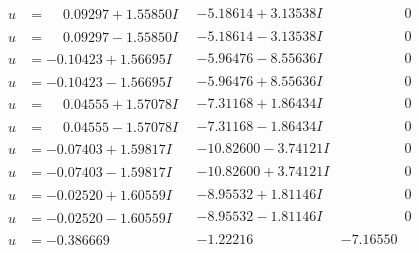 \documentclass[1p]{elsarticle_modified}
\theoremstyle{definition}
\begin{document}
$$\begin{array}{c|c|c}
\begin{aligned}
u &= \phantom{-}0.09297 + 1.55850 I\end{aligned}
 & -5.18614 + 3.13538 I & \phantom{-0.000000 } 0 \\ \hline\begin{aligned}
u &= \phantom{-}0.09297 - 1.55850 I\end{aligned}
 & -5.18614 - 3.13538 I & \phantom{-0.000000 } 0 \\ \hline\begin{aligned}
u &= -0.10423 + 1.56695 I\end{aligned}
 & -5.96476 - 8.55636 I & \phantom{-0.000000 } 0 \\ \hline\begin{aligned}
u &= -0.10423 - 1.56695 I\end{aligned}
 & -5.96476 + 8.55636 I & \phantom{-0.000000 } 0 \\ \hline\begin{aligned}
u &= \phantom{-}0.04555 + 1.57078 I\end{aligned}
 & -7.31168 + 1.86434 I & \phantom{-0.000000 } 0 \\ \hline\begin{aligned}
u &= \phantom{-}0.04555 - 1.57078 I\end{aligned}
 & -7.31168 - 1.86434 I & \phantom{-0.000000 } 0 \\ \hline\begin{aligned}
u &= -0.07403 + 1.59817 I\end{aligned}
 & -10.82600 - 3.74121 I & \phantom{-0.000000 } 0 \\ \hline\begin{aligned}
u &= -0.07403 - 1.59817 I\end{aligned}
 & -10.82600 + 3.74121 I & \phantom{-0.000000 } 0 \\ \hline\begin{aligned}
u &= -0.02520 + 1.60559 I\end{aligned}
 & -8.95532 + 1.81146 I & \phantom{-0.000000 } 0 \\ \hline\begin{aligned}
u &= -0.02520 - 1.60559 I\end{aligned}
 & -8.95532 - 1.81146 I & \phantom{-0.000000 } 0 \\ \hline\begin{aligned}
u &= -0.386669\phantom{ +0.000000I}\end{aligned}
 & -1.22216\phantom{ +0.000000I} & -7.16550\phantom{ +0.000000I} \\ \hline\begin{aligned}

\end{aligned}
\end{array}$$
\end{document}
